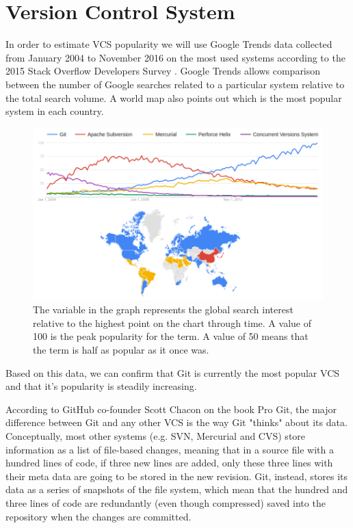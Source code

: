 \section{Version Control System} \label{sec:git}

In order to estimate VCS popularity we will use Google Trends data collected from January 2004 to November 2016 on the most used systems according to the 2015 Stack Overflow Developers Survey \cite{ref:stackoverflow}. Google Trends allows comparison between the number of Google searches related to a particular system relative to the total search volume. A world map also points out which is the most popular system in each country.

\begin{figure}[H]
	\centering
	\includegraphics[width=\textwidth]{figures/vcs_pop.png}
	\caption{The variable in the graph represents the global search interest relative to the highest point on the chart through time. A value of 100 is the peak popularity for the term. A value of 50 means that the term is half as popular as it once was.}
	\label{fig:vcs_pop}
\end{figure}

Based on this data, we can confirm that Git is currently the most popular VCS and that it's popularity is steadily increasing.

According to GitHub co-founder Scott Chacon on the book Pro Git\cite{ref:progit}, the major difference between Git and any other VCS is the way Git "thinks" about its data. Conceptually, most other systems (e.g. SVN, Mercurial and CVS) store information as a list of file-based changes, meaning that in a source file with a hundred lines of code, if three new lines are added, only these three lines with their meta data are going to be stored in the new revision. Git, instead, stores its data as a series of snapshots of the file system, which mean that the hundred and three lines of code are redundantly (even though compressed) saved into the repository when the changes are committed.

